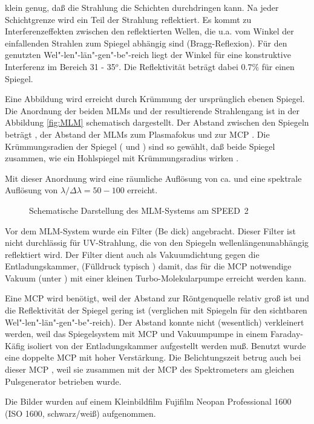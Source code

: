 klein genug, daß die Strahlung die Schichten durchdringen kann. Na
jeder Schichtgrenze wird ein Teil der Strahlung reflektiert. Es
kommt zu Interferenzeffekten zwischen den reflektierten Wellen,
die u.a. vom Winkel der einfallenden Strahlen zum Spiegel abhängig
sind (Bragg-Reflexion). Für den genutzten
Wel"-len"-län"-gen"-be"-reich liegt der Winkel für eine
konstruktive Interferenz im Bereich 31 - 35$^o$. Die Reflektivität
beträgt dabei 0.7\% für einen Spiegel.
\par
Eine Abbildung wird erreicht durch Krümmung der ursprünglich
ebenen Spiegel. Die Anordnung der beiden MLMs und der
resultierende Strahlengang ist in der Abbildung \vref{fig:MLM}
schematisch dargestellt. Der Abstand zwischen den Spiegeln beträgt
, der Abstand der MLMs zum Plasmafokus 
und zur MCP . Die Krümmungsradien der Spiegel
( und ) sind so gewählt, daß beide
Spiegel zusammen, wie ein Hohlspiegel mit Krümmungsradius
 wirken \cite{chen:90}.
\par
Mit dieser Anordnung wird eine räumliche Auflösung von ca.
 und eine spektrale Auflösung von $\lambda /
\Delta\lambda = 50-100$ erreicht.
%
\par
\begin{figure}[H]
  \center
  \caption{Schematische Darstellung des MLM-Systems am SPEED~2 \cite{bobashev:97}}
  \label{fig:MLM}
\end{figure}
%
\par
Vor dem MLM-System wurde ein Filter (Be  dick)
angebracht. Dieser Filter ist nicht durchlässig für UV-Strahlung, die
von den Spiegeln wellenlängenunabhängig reflektiert wird. Der Filter
dient auch als Vakuumdichtung gegen die Entladungskammer, (Fülldruck
typisch ) damit, das für die MCP notwendige Vakuum (unter
) mit einer kleinen Turbo-Molekularpumpe erreicht
werden kann.
\par
Eine MCP wird benötigt, weil der Abstand zur Röntgenquelle relativ
groß ist und die Reflektivität der Spiegel gering ist (verglichen
mit Spiegeln für den sichtbaren Wel"-len"-län"-gen"-be"-reich).
Der Abstand konnte nicht (wesentlich) verkleinert werden, weil das
Spiegelsystem mit MCP und Vakuumpumpe in einem Faraday-Käfig
isoliert von der Entladungskammer aufgestellt werden muß. Benutzt
wurde eine doppelte MCP mit hoher Verstärkung. Die Belichtungszeit
betrug auch bei dieser MCP , weil sie zusammen mit
der MCP des Spektrometers am gleichen Pulsgenerator betrieben
wurde.
\par
Die Bilder wurden auf einem Kleinbildfilm Fujifilm Neopan
Professional 1600 (ISO 1600, schwarz/weiß) aufgenommen.
